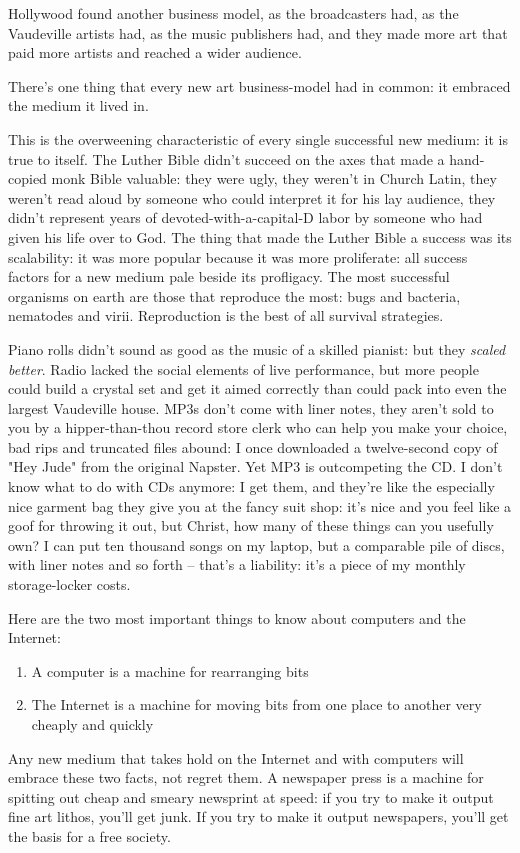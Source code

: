 Hollywood found another business model, as the broadcasters had, as
the Vaudeville artists had, as the music publishers had, and they
made more art that paid more artists and reached a wider audience.

There's one thing that every new art business-model had in common:
it embraced the medium it lived in.

This is the overweening characteristic of every single successful
new medium: it is true to itself. The Luther Bible didn't succeed
on the axes that made a hand-copied monk Bible valuable: they were
ugly, they weren't in Church Latin, they weren't read aloud by
someone who could interpret it for his lay audience, they didn't
represent years of devoted-with-a-capital-D labor by someone who
had given his life over to God. The thing that made the Luther
Bible a success was its scalability: it was more popular because it
was more proliferate: all success factors for a new medium pale
beside its profligacy. The most successful organisms on earth are
those that reproduce the most: bugs and bacteria, nematodes and
virii. Reproduction is the best of all survival strategies.

Piano rolls didn't sound as good as the music of a skilled pianist:
but they \emph{scaled better}. Radio lacked the social elements
of live performance, but more people could build a crystal set and
get it aimed correctly than could pack into even the largest
Vaudeville house. MP3s don't come with liner notes, they aren't
sold to you by a hipper-than-thou record store clerk who can help
you make your choice, bad rips and truncated files abound: I once
downloaded a twelve-second copy of "Hey Jude" from the original
Napster. Yet MP3 is outcompeting the CD. I don't know what to do
with CDs anymore: I get them, and they're like the especially nice
garment bag they give you at the fancy suit shop: it's nice and you
feel like a goof for throwing it out, but Christ, how many of these
things can you usefully own? I can put ten thousand songs on my
laptop, but a comparable pile of discs, with liner notes and so
forth -- that's a liability: it's a piece of my monthly
storage-locker costs.

Here are the two most important things to know about computers and
the Internet:

\begin{enumerate}
\item
  A computer is a machine for rearranging bits
\item
  The Internet is a machine for moving bits from one place to another
  very cheaply and quickly
\end{enumerate}
Any new medium that takes hold on the Internet and with computers
will embrace these two facts, not regret them. A newspaper press is
a machine for spitting out cheap and smeary newsprint at speed: if
you try to make it output fine art lithos, you'll get junk. If you
try to make it output newspapers, you'll get the basis for a free
society.

